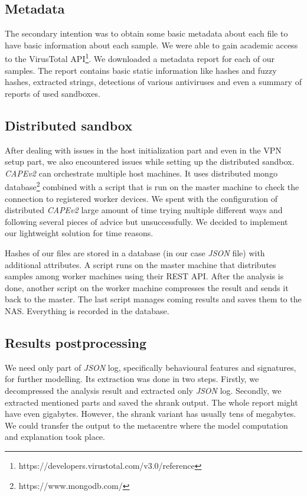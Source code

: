 \subsection{Metadata}
The secondary intention was to obtain some basic metadata about each file to have basic information about each sample. We were able to gain academic access to the VirusTotal API\footnote{https://developers.virustotal.com/v3.0/reference}. We downloaded a metadata report for each of our samples. The report contains basic static information like hashes and fuzzy hashes, extracted strings, detections of various antiviruses and even a summary of reports of used sandboxes.

\subsection{Distributed sandbox}
After dealing with issues in the host initialization part and even in the VPN setup part, we also encountered issues while setting up the distributed sandbox. \emph{CAPEv2} can orchestrate multiple host machines. It uses distributed mongo database\footnote{https://www.mongodb.com/} combined with a script that is run on the master machine to check the connection to registered worker devices. We spent with the configuration of distributed \emph{CAPEv2} large amount of time trying multiple different ways and following several pieces of advice but unsuccessfully. We decided to implement our lightweight solution for time reasons.

Hashes of our files are stored in a database (in our case \emph{JSON} file) with additional attributes. A script runs on the master machine that distributes samples among worker machines using their REST API. After the analysis is done, another script on the worker machine compresses the result and sends it back to the master. The last script manages coming results and saves them to the NAS. Everything is recorded in the database.

\subsection{Results postprocessing}
We need only part of \emph{JSON} log, specifically behavioural features and signatures, for further modelling. Its extraction was done in two steps. Firstly, we decompressed the analysis result and extracted only \emph{JSON} log. Secondly, we extracted mentioned parts and saved the shrank output. The whole report might have even gigabytes. However, the shrank variant has usually tens of megabytes. We could transfer the output to the metacentre where the model computation and explanation took place.

